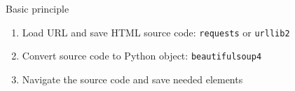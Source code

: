 \begin{frame}{Basic principle}
\begin{enumerate}
	\item Load URL and save HTML source code: {\tt requests} or {\tt urllib2}
	\item Convert source code to Python object: {\tt beautifulsoup4}
	\item Navigate the source code and save needed elements
\end{enumerate}
\end{frame}